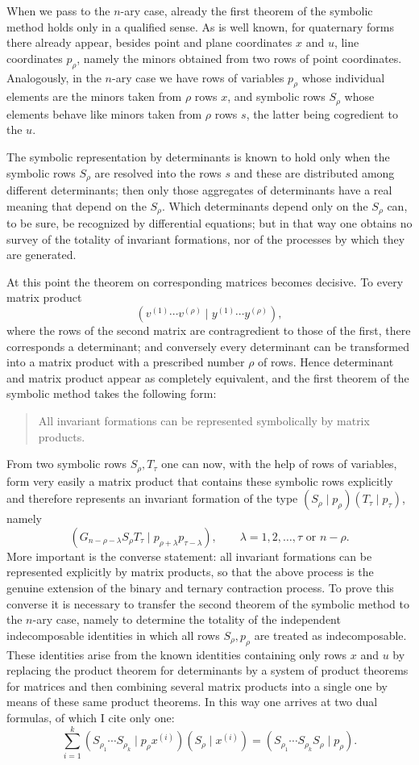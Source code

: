 \documentclass[11pt]{article}
\begin{document}
When we pass to the $n$-ary case, already the first theorem of the symbolic method holds only in a qualified sense. As is well known, for quaternary forms there already appear, besides point and plane coordinates $x$ and $u$, line coordinates $p_\rho$, namely the minors obtained from two rows of point coordinates. Analogously, in the $n$-ary case we have rows of variables $p_\rho$ whose individual elements are the minors taken from $\rho$ rows $x$, and symbolic rows $S_\rho$ whose elements behave like minors taken from $\rho$ rows $s$, the latter being cogredient to the $u$.

The symbolic representation by determinants is known to hold only when the symbolic rows $S_\rho$ are resolved into the rows $s$ and these are distributed among different determinants; then only those aggregates of determinants have a real meaning that depend on the $S_\rho$. Which determinants depend only on the $S_\rho$ can, to be sure, be recognized by differential equations; but in that way one obtains no survey of the totality of invariant formations, nor of the processes by which they are generated.

At this point the theorem on corresponding matrices becomes decisive. To every matrix product
\[
(v^{(1)}\cdots v^{(\rho)} \mid y^{(1)}\cdots y^{(\rho)}),
\]
where the rows of the second matrix are contragredient to those of the first, there corresponds a determinant; and conversely every determinant can be transformed into a matrix product with a prescribed number $\rho$ of rows. Hence determinant and matrix product appear as completely equivalent, and the first theorem of the symbolic method takes the following form:

\begin{quote}
All invariant formations can be represented symbolically by matrix products.
\end{quote}

From two symbolic rows $S_\rho,T_\tau$ one can now, with the help of rows of variables, form very easily a matrix product that contains these symbolic rows explicitly and therefore represents an invariant formation of the type $(S_\rho\mid p_\rho)(T_\tau\mid p_\tau)$, namely
\[
(G_{n-\rho-\lambda}S_\rho T_\tau \mid p_{\rho+\lambda}p_{\tau-\lambda}),
\qquad
\lambda = 1,2,\dots,\tau \text{ or } n-\rho.
\tag{1}
\]
More important is the converse statement: all invariant formations can be represented explicitly by matrix products, so that the above process is the genuine extension of the binary and ternary contraction process. To prove this converse it is necessary to transfer the second theorem of the symbolic method to the $n$-ary case, namely to determine the totality of the independent indecomposable identities in which all rows $S_\rho,p_\rho$ are treated as indecomposable. These identities arise from the known identities containing only rows $x$ and $u$ by replacing the product theorem for determinants by a system of product theorems for matrices and then combining several matrix products into a single one by means of these same product theorems. In this way one arrives at two dual formulas, of which I cite only one:
\[
\sum_{i=1}^{k} (S_{\rho_1}\cdots S_{\rho_k}\mid p_\rho x^{(i)})(S_\rho\mid x^{(i)})
=
(S_{\rho_1}\cdots S_{\rho_k}S_\rho\mid p_\rho).
\tag{2}
\]
\end{document}
